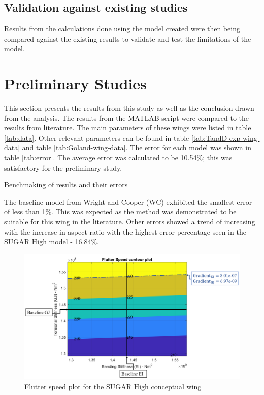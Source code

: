 \documentclass[11pt]{article}
\begin{document}
\subsection{Validation against existing studies}
Results from the calculations done using the model created were then being compared against the existing results to validate and test the limitations of the model.


\section{Preliminary Studies}
\label{sec:prelim}
This section presents the results from this study as well as the conclusion drawn from the analysis. The results from the MATLAB script were compared to the results from literature. The main parameters of these wings were listed in table \ref{tab:data}. Other relevant parameters can be found in table \ref{tab:TandD-exp-wing-data} and table \ref{tab:Goland-wing-data}. The error for each model was shown in table \ref{tab:error}. The average error was calculated to be 10.54\%; this was satisfactory for the preliminary study.
\vspace{-.5cm}
\begin{table}[H]
    \centering
    \caption{Benchmaking of results and their errors}
    
    \label{tab:error}
\end{table}

The baseline model from Wright and Cooper \cite{Wright2015INTRODUCTIONLOADS} (WC) exhibited the smallest error of less than 1\%. This was expected as the method was demonstrated to be suitable for this wing in the literature. Other errors showed a trend of increasing with the increase in aspect ratio with the highest error percentage seen in the SUGAR High model - 16.84\%.\\

\iffalse
\begin{figure}[H]
    \centering
    \includegraphics[width = \textwidth]{figures/SUGAR_flutt.png}
    \caption{Flutter speed plot for the SUGAR High conceptual wing}
    \label{fig:SUGAR-flutt}
\end{figure}
\end{document}
